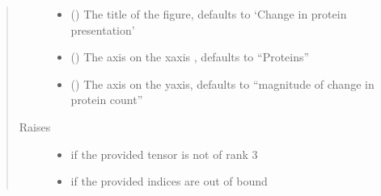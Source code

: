 \documentclass[letterpaper,10pt,english]{sphinxmanual}
\begin{document}
\begin{fulllineitems}
\begin{quote}
\begin{description}
\begin{itemize}
\item {} 
 (\sphinxstyleliteralemphasis{\sphinxupquote{, }}) \textendash{} The title of the figure, defaults to ‘Change in protein presentation’

\item {} 
 (\sphinxstyleliteralemphasis{\sphinxupquote{, }}) \textendash{} The axis on the x\sphinxhyphen{}axis , defaults to “Proteins”

\item {} 
 (\sphinxstyleliteralemphasis{\sphinxupquote{, }}) \textendash{} The axis on the y\sphinxhyphen{}axis, defaults to “magnitude of change in protein count”

\end{itemize}

\item[{Raises}] \leavevmode\begin{itemize}
\item {} 
 \textendash{} if the provided tensor is not of rank 3

\item {} 
 \textendash{} if the provided indices are out of bound

\end{itemize}

\end{description}\end{quote}

\end{fulllineitems}

\end{document}
